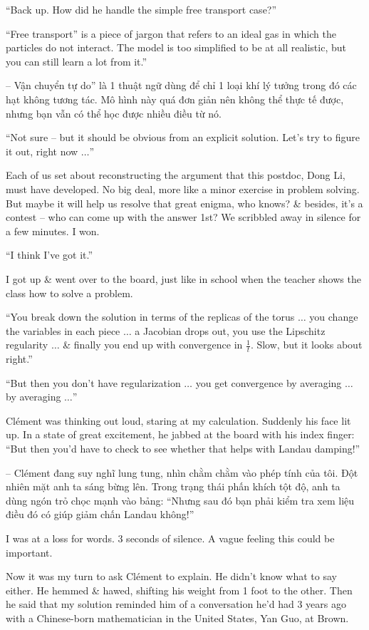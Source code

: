 \documentclass{article}
\begin{document}
\begin{enumerate}
	``Back up. How did he handle the simple free transport case?''

	``Free transport'' is a piece of jargon that refers to an ideal gas in which the particles do not interact. The model is too simplified to be at all realistic, but you can still learn a lot from it.''

	-- Vận chuyển tự do'' là 1 thuật ngữ dùng để chỉ 1 loại khí lý tưởng trong đó các hạt không tương tác. Mô hình này quá đơn giản nên không thể thực tế được, nhưng bạn vẫn có thể học được nhiều điều từ nó.

	``Not sure -- but it should be obvious from an explicit solution. Let's try to figure it out, right now $\ldots$''

	Each of us set about reconstructing the argument that this postdoc, Dong Li, must have developed. No big deal, more like a minor exercise in problem solving. But maybe it will help us resolve that great enigma, who knows? \& besides, it's a contest -- who can come up with the answer 1st? We scribbled away in silence for a few minutes. I won.

	``I think I've got it.''

	I got up \& went over to the board, just like in school when the teacher shows the class how to solve a problem.

	``You break down the solution in terms of the replicas of the torus $\ldots$ you change the variables in each piece $\ldots$ a Jacobian drops out, you use the Lipschitz regularity $\ldots$ \& finally you end up with convergence in $\frac{1}{t}$. Slow, but it looks about right.''

	``But then you don't have regularization $\ldots$ you get convergence by averaging $\ldots$ by averaging $\ldots$''

	Cl\'ement was thinking out loud, staring at my calculation. Suddenly his face lit up. In a state of great excitement, he jabbed at the board with his index finger: ``But then you'd have to check to see whether that helps with Landau damping!''

	-- Cl\'ement đang suy nghĩ lung tung, nhìn chằm chằm vào phép tính của tôi. Đột nhiên mặt anh ta sáng bừng lên. Trong trạng thái phấn khích tột độ, anh ta dùng ngón trỏ chọc mạnh vào bảng: ``Nhưng sau đó bạn phải kiểm tra xem liệu điều đó có giúp giảm chấn Landau không!''

	I was at a loss for words. 3 seconds of silence. A vague feeling this could be important.

	Now it was my turn to ask Cl\'ement to explain. He didn't know what to say either. He hemmed \& hawed, shifting his weight from 1 foot to the other. Then he said that my solution reminded him of a conversation he'd had 3 years ago with a Chinese-born mathematician in the United States, Yan Guo, at Brown.


\end{enumerate}
\end{document}
